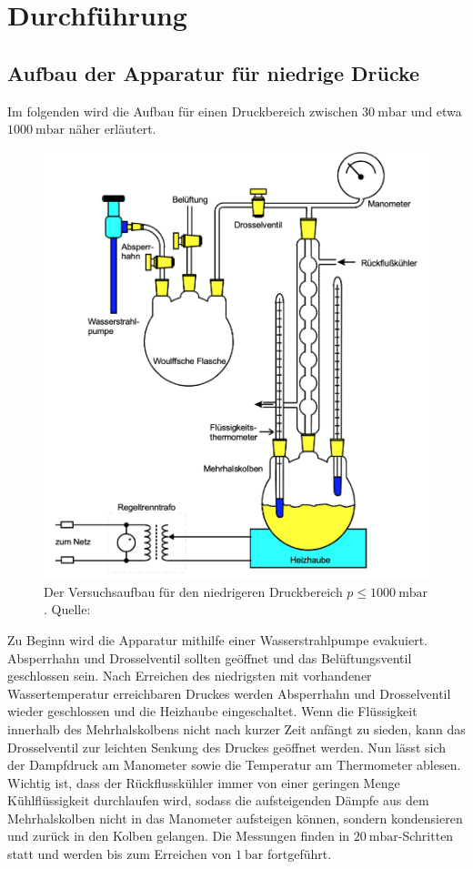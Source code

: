 \section{Durchführung}
  \subsection{Aufbau der Apparatur für niedrige Drücke}
    Im folgenden wird die Aufbau für einen Druckbereich zwischen $\SI{30}{\milli\bar}$ und etwa $\SI{1000}{\milli\bar}$ näher
    erläutert.
    \begin{figure}
      \centering
      \includegraphics[scale=0.5]{Content/apparaturniedrige.png}
      \caption{Der Versuchsaufbau für den niedrigeren Druckbereich $p \leq \SI{1000}{\milli\bar}$. Quelle: \cite{AP01}}
      \label{fig:niedrigedrücke}
    \end{figure}
    Zu Beginn wird die Apparatur mithilfe einer Wasserstrahlpumpe evakuiert. Absperrhahn und Drosselventil sollten geöffnet und
    das Belüftungsventil geschlossen sein. Nach Erreichen des niedrigsten mit vorhandener Wassertemperatur erreichbaren Druckes
    werden Absperrhahn und Drosselventil wieder geschlossen und die Heizhaube eingeschaltet. Wenn die Flüssigkeit innerhalb
    des Mehrhalskolbens nicht nach kurzer Zeit anfängt zu sieden, kann das Drosselventil zur leichten Senkung des Druckes
    geöffnet werden. Nun lässt sich der Dampfdruck am Manometer sowie die Temperatur am Thermometer ablesen. Wichtig ist, dass
    der Rückflusskühler immer von einer geringen Menge Kühlflüssigkeit durchlaufen wird, sodass die aufsteigenden Dämpfe aus dem
    Mehrhalskolben nicht in das Manometer aufsteigen können, sondern kondensieren und zurück in den Kolben gelangen.
    Die Messungen finden in $\SI{20}{\milli\bar}$-Schritten statt und werden bis zum Erreichen von $\SI{1}{\bar}$ fortgeführt.

